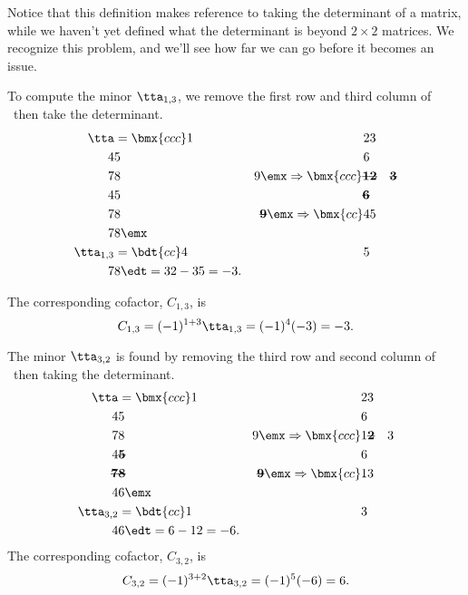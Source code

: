 \smallskip

Notice that this definition makes reference to taking the determinant of a matrix, while we haven't yet defined what the determinant is beyond $2\times 2$ matrices. We recognize this problem, and we'll see how far we can go before it becomes an issue.

\medskip

{To compute the minor $\tta_{1,3}$, we remove the first row and third column of \tta\ then take the determinant. 
\begin{align*}
\tta &= \bmx{ccc}1&2&3\\4&5&6\\7&8&9\emx\Rightarrow\bmx{ccc}\textbf{\sout{1}}&\textbf{\sout{2}}&\textbf{\sout{3}}\\4&5&\textbf{\sout{6}}\\7&8&\textbf{\sout{9}}\emx\Rightarrow\bmx{cc}4&5\\7&8\emx \\
\tta_{1,3} &= \bdt{cc}4&5\\7&8\edt = 32-35 = -3.
\end{align*}
 
The corresponding cofactor, $C_{1,3}$, is
\[
C_{1,3} = (-1)^{1+3}\tta_{1,3} = (-1)^4(-3) = -3.
\]

The minor $\tta_{3,2}$ is found by removing the third row and second column of \tta\ then taking the determinant.
\begin{align*}
\tta &= \bmx{ccc}1&2&3\\4&5&6\\7&8&9\emx\Rightarrow\bmx{ccc}1&\textbf{\sout{2}}&3\\4&\textbf{\sout{5}}&6\\ \textbf{\sout{7}}&\textbf{\sout{8}}&\textbf{\sout{9}}\emx\Rightarrow \bmx{cc}1&3\\4&6\emx\\
\tta_{3,2} &= \bdt{cc}1&3\\4&6\edt = 6-12 = -6.
\end{align*} 
The corresponding cofactor, $C_{3,2}$, is
\[
C_{3,2} = (-1)^{3+2}\tta_{3,2} = (-1)^5(-6) = 6.
\]

}
